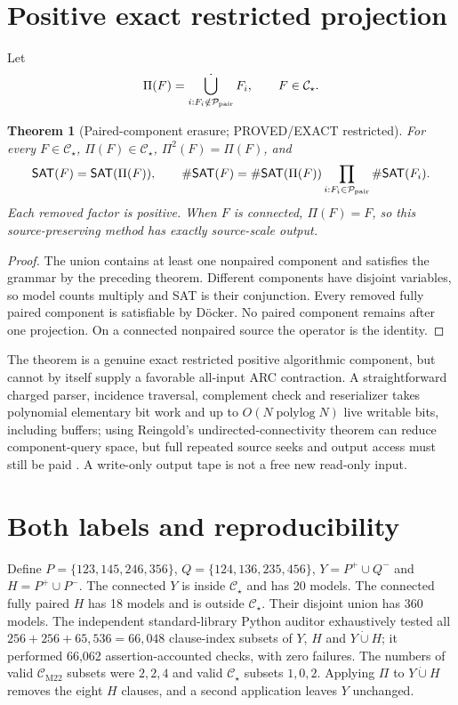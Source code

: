 \documentclass[11pt]{article}
\newtheorem{theorem}{Theorem}
\newcommand{\CM}{\mathcal C_{\mathrm{M22}}}
\newcommand{\CS}{\mathcal C_{\star}}
\newcommand{\SAT}{\mathsf{SAT}}
\begin{document}
\section{Positive exact restricted projection}
Let
\[
\Pi(F)=\mathop{\dot\bigcup}_{i:F_i\notin\mathcal P_{\rm pair}}F_i,\qquad F\in\CS.
\]
\begin{theorem}[Paired-component erasure; PROVED/EXACT restricted]
For every $F\in\CS$, $\Pi(F)\in\CS$, $\Pi^2(F)=\Pi(F)$, and
\[
\SAT(F)=\SAT(\Pi(F)),\qquad
\#\SAT(F)=\#\SAT(\Pi(F))
\prod_{i:F_i\in\mathcal P_{\rm pair}}\#\SAT(F_i).
\]
Each removed factor is positive. When $F$ is connected, $\Pi(F)=F$, so this source-preserving method has exactly source-scale output.
\end{theorem}
\begin{proof}
The union contains at least one nonpaired component and satisfies the grammar by the preceding theorem. Different components have disjoint variables, so model counts multiply and SAT is their conjunction. Every removed fully paired component is satisfiable by D\"ocker. No paired component remains after one projection. On a connected nonpaired source the operator is the identity.
\end{proof}
The theorem is a genuine exact restricted positive algorithmic component, but cannot by itself supply a favorable all-input ARC contraction. A straightforward charged parser, incidence traversal, complement check and reserializer takes polynomial elementary bit work and up to $O(N\operatorname{polylog}N)$ live writable bits, including buffers; using Reingold's undirected-connectivity theorem can reduce component-query space, but full repeated source seeks and output access must still be paid \cite{reingold}. A write-only output tape is not a free new read-only input.

\section{Both labels and reproducibility}
Define $P=\{123,145,246,356\}$, $Q=\{124,136,235,456\}$, $Y=P^+\cup Q^-$ and $H=P^+\cup P^-$. The connected $Y$ is inside $\CS$ and has 20 models. The connected fully paired $H$ has 18 models and is outside $\CS$. Their disjoint union has 360 models. The independent standard-library Python auditor exhaustively tested all $256+256+65{,}536=66{,}048$ clause-index subsets of $Y$, $H$ and $Y\dot\cup H$; it performed 66,062 assertion-accounted checks, with zero failures. The numbers of valid $\CM$ subsets were $2,2,4$ and valid $\CS$ subsets $1,0,2$. Applying $\Pi$ to $Y\dot\cup H$ removes the eight $H$ clauses, and a second application leaves $Y$ unchanged.
\end{document}
